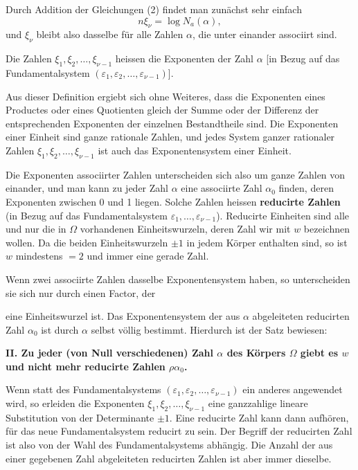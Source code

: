 \documentclass[11pt]{article}
\newcommand{\Na}{N_a}
\begin{document}
Durch Addition der Gleichungen (2) findet man zunächst sehr einfach
\begin{equation}
n\xi_\nu=\log \Na(\alpha),
\tag{4}
\end{equation}
und $\xi_\nu$ bleibt also dasselbe für alle Zahlen $\alpha$, die unter einander associirt sind.

Die Zahlen $\xi_1,\xi_2,\ldots,\xi_{\nu-1}$ heissen die Exponenten der Zahl $\alpha$ [in Bezug auf das Fundamentalsystem $(\varepsilon_1,\varepsilon_2,\ldots,\varepsilon_{\nu-1})$].

Aus dieser Definition ergiebt sich ohne Weiteres, dass die Exponenten eines Productes oder eines Quotienten gleich der Summe oder der Differenz der entsprechenden Exponenten der einzelnen Bestandtheile sind. Die Exponenten einer Einheit sind ganze rationale Zahlen, und jedes System ganzer rationaler Zahlen $\xi_1,\xi_2,\ldots,\xi_{\nu-1}$ ist auch das Exponentensystem einer Einheit.

Die Exponenten associirter Zahlen unterscheiden sich also um ganze Zahlen von einander, und man kann zu jeder Zahl $\alpha$ eine associirte Zahl $\alpha_0$ finden, deren Exponenten zwischen 0 und 1 liegen. Solche Zahlen heissen \textbf{reducirte Zahlen} (in Bezug auf das Fundamentalsystem $\varepsilon_1,\ldots,\varepsilon_{\nu-1}$). Reducirte Einheiten sind alle und nur die in $\Omega$ vorhandenen Einheitswurzeln, deren Zahl wir mit $w$ bezeichnen wollen. Da die beiden Einheitswurzeln $\pm1$ in jedem Körper enthalten sind, so ist $w$ mindestens $=2$ und immer eine gerade Zahl.

Wenn zwei associirte Zahlen dasselbe Exponentensystem haben, so unterscheiden sie sich nur durch einen Factor, der

eine Einheitswurzel ist. Das Exponentensystem der aus $\alpha$ abgeleiteten reducirten Zahl $\alpha_0$ ist durch $\alpha$ selbst völlig bestimmt. Hierdurch ist der Satz bewiesen:

\begin{center}
\textbf{II. Zu jeder (von Null verschiedenen) Zahl $\alpha$ des Körpers $\Omega$ giebt es $w$ und nicht mehr reducirte Zahlen $\rho\alpha_0$.}
\end{center}

Wenn statt des Fundamentalsystems $(\varepsilon_1,\varepsilon_2,\ldots,\varepsilon_{\nu-1})$ ein anderes angewendet wird, so erleiden die Exponenten $\xi_1,\xi_2,\ldots,\xi_{\nu-1}$ eine ganzzahlige lineare Substitution von der Determinante $\pm1$. Eine reducirte Zahl kann dann aufhören, für das neue Fundamentalsystem reducirt zu sein. Der Begriff der reducirten Zahl ist also von der Wahl des Fundamentalsystems abhängig. Die Anzahl der aus einer gegebenen Zahl abgeleiteten reducirten Zahlen ist aber immer dieselbe.
\end{document}
